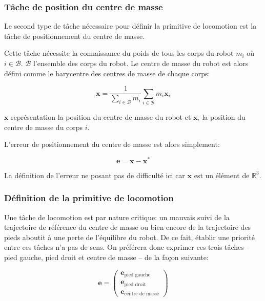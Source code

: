 \subsubsection{Tâche de position du centre de masse}


Le second type de tâche nécessaire pour définir la primitive de
locomotion est la tâche de positionnement du centre de masse.

Cette tâche nécessite la connaissance du poids de tous les corps du
robot $m_i$ où $i \in \mathcal{B}$. $\mathcal{B}$ l'ensemble des corps
du robot. Le centre de masse du robot est alors
défini comme le barycentre des centres de masse de chaque corps:

\begin{equation}
  \mathbf{x} = \frac{1}{\sum_{i \in \mathcal{B}} m_i} \sum_{i \in \mathcal{B}} m_i \mathbf{x}_i
\end{equation}

$\mathbf{x}$ représentation la position du centre de masse du robot et
$\mathbf{x}_i$ la position du centre de masse du corps $i$.

L'erreur de positionnement du centre de masse est alors simplement:

\begin{equation}
  \mathbf{e} = \mathbf{x} - \mathbf{x}^{*}
\end{equation}

La définition de l'erreur ne posant pas de difficulté ici car
$\mathbf{x}$ est un élément de $\mathbb{R}^3$.


\subsubsection{Définition de la primitive de locomotion}

Une tâche de locomotion est par nature critique: un mauvais suivi de
la trajectoire de référence du centre de masse ou bien encore de la
trajectoire des pieds aboutit à une perte de l'équilibre du robot. De
ce fait, établir une priorité entre ces tâches n'a pas de sens. On
préférera donc exprimer ces trois tâches -- pied gauche, pied droit et
centre de masse -- de la façon suivante:

\begin{equation}
  \mathbf{e} = \left(
  \begin{array}{c}
    \mathbf{e}_{\text{pied gauche}}\\
    \mathbf{e}_{\text{pied droit}}\\
    \mathbf{e}_{\text{centre de masse}}
  \end{array}\right)
\end{equation}

